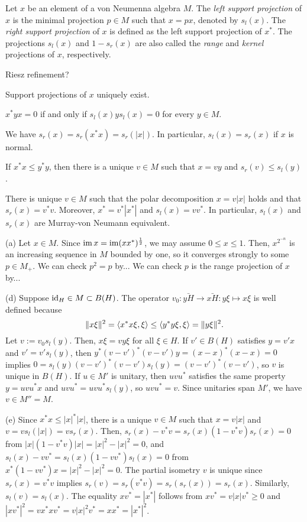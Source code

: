 \documentclass{../../large}
\begin{document}
\begin{prb}
Let $x$ be an element of a von Neumenna algebra $M$.
The \emph{left support projection} of $x$ is the minimal projection $p\in M$ such that $x=px$, denoted by $s_l(x)$.
The \emph{right support projection} of $x$ is defined as the left support projection of $x^*$.
The projections $s_l(x)$ and $1-s_r(x)$ are also called the \emph{range} and \emph{kernel} projections of $x$, respectively.

Riesz refinement?
\begin{parts}
\item Support projections of $x$ uniquely exist.
\item $x^*yx=0$ if and only if $s_l(x)ys_l(x)=0$ for every $y\in M$.
\item We have $s_r(x)=s_r(x^*x)=s_r(|x|)$. In particular, $s_l(x)=s_r(x)$ if $x$ is normal.
\item If $x^*x\le y^*y$, then there is a unique $v\in M$ such that $x=vy$ and $s_r(v)\le s_l(y)$.
\item There is unique $v\in M$ such that the polar decomposition $x=v|x|$ holds and that $s_r(x)=v^*v$. Moreover, $x^*=v^*|x^*|$ and $s_l(x)=vv^*$. In particular, $s_l(x)$ and $s_r(x)$ are Murray-von Neumann equivalent.
\end{parts}
\end{prb}
\begin{pf}
(a)
Let $x\in M$.
Since $\operatorname{im} x=\operatorname{im}(xx^*)^{\frac12}$, we may assume $0\le x\le1$.
Then, $x^{2^{-n}}$ is an increasing sequence in $M$ bounded by one, so it converges strongly to some $p\in M_+$.
We can check $p^2=p$ by...
We can check $p$ is the range projection of $x$ by...

(d)
Suppose $\operatorname{id}_H\in M\subset B(H)$.
The operator $v_0:\bar{yH}\to\bar{xH}:y\xi\mapsto x\xi$ is well defined because
\[\|x\xi\|^2=\langle x^*x\xi,\xi\rangle\le\langle y^*y\xi,\xi\rangle=\|y\xi\|^2.\]
Let $v:=v_0s_l(y)$.
Then, $x\xi=vy\xi$ for all $\xi\in H$.
If $v'\in B(H)$ satisfies $y=v'x$ and $v'=v's_l(y)$, then $y^*(v-v')^*(v-v')y=(x-x)^*(x-x)=0$ implies $0=s_l(y)(v-v')^*(v-v')s_l(y)=(v-v')^*(v-v')$, so $v$ is unique in $B(H)$.
If $u\in M'$ is unitary, then $uvu^*$ satisfies the same property $y=uvu^*x$ and $uvu^*=uvu^*s_l(y)$, so $uvu^*=v$.
Since unitaries span $M'$, we have $v\in M''=M$.

(e)
Since $x^*x\le|x|^*|x|$, there is a unique $v\in M$ such that $x=v|x|$ and $v=vs_l(|x|)=vs_r(x)$.
Then, $s_r(x)-v^*v=s_r(x)(1-v^*v)s_r(x)=0$ from $|x|(1-v^*v)|x|=|x|^2-|x|^2=0$, and $s_l(x)-vv^*=s_l(x)(1-vv^*)s_l(x)=0$ from $x^*(1-vv^*)x=|x|^2-|x|^2=0$.
The partial isometry $v$ is unique since $s_r(x)=v^*v$ implies $s_r(v)=s_r(v^*v)=s_r(s_r(x))=s_r(x)$.
Similarly, $s_l(v)=s_l(x)$.
The equality $xv^*=|x^*|$ follows from $xv^*=v|x|v^*\ge0$ and $|xv^*|^2=vx^*xv^*=v|x|^2v^*=xx^*=|x^*|^2$.
\end{pf}
\end{document}
